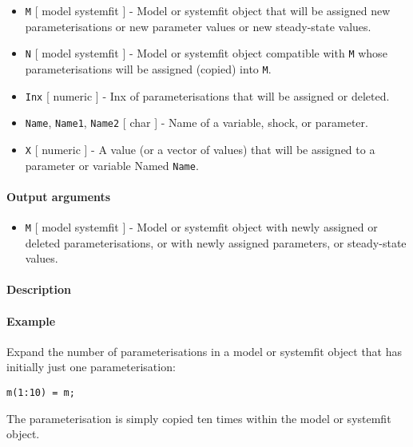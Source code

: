 \begin{itemize}
\item
  \texttt{M} {[} model \textbar{} systemfit {]} - Model or systemfit
  object that will be assigned new parameterisations or new parameter
  values or new steady-state values.
\item
  \texttt{N} {[} model \textbar{} systemfit {]} - Model or systemfit
  object compatible with \texttt{M} whose parameterisations will be
  assigned (copied) into \texttt{M}.
\item
  \texttt{Inx} {[} numeric {]} - Inx of parameterisations that will be
  assigned or deleted.
\item
  \texttt{Name}, \texttt{Name1}, \texttt{Name2} {[} char {]} - Name of a
  variable, shock, or parameter.
\item
  \texttt{X} {[} numeric {]} - A value (or a vector of values) that will
  be assigned to a parameter or variable Named \texttt{Name}.
\end{itemize}

\paragraph{Output arguments}\label{output-arguments}

\begin{itemize}
\itemsep1pt\parskip0pt
\item
  \texttt{M} {[} model \textbar{} systemfit {]} - Model or systemfit
  object with newly assigned or deleted parameterisations, or with newly
  assigned parameters, or steady-state values.
\end{itemize}

\paragraph{Description}\label{description}

\paragraph{Example}\label{example}

Expand the number of parameterisations in a model or systemfit object
that has initially just one parameterisation:

\begin{verbatim}
m(1:10) = m;
\end{verbatim}

The parameterisation is simply copied ten times within the model or
systemfit object.


